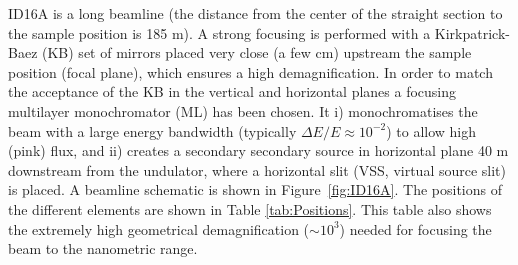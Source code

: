 \documentclass{iucr}              %
\begin{document}
\begin{table}\label{tab:Undulators}
\centering
\caption{Parameters of the undulators available at the ID16A beamline: period ($\lambda_u$), length ($L$), number of identical undulators ($N$) and deflection parameter ($K$) values for the three main photon energies in use. The valuse are shown for the two ESRF magnetic lattices: the old one (labelled ESRF, with $E_e = 6.04$ GeV) and the new one (EBS, with $E_e = 6.00$ GeV). $n$ is the emission harmonic in use for each particular photon energy.}

\end{table}

ID16A is a long beamline (the distance from the center of the straight section to the sample position is 185 m). A strong focusing is performed with a Kirkpatrick-Baez (KB) set of mirrors placed very close (a few cm) upstream the sample position (focal plane), which ensures a high demagnification. In order to match the acceptance of the KB in the vertical and horizontal planes a focusing multilayer monochromator (ML) has
been chosen. It i) monochromatises the beam with a large energy bandwidth (typically $\Delta E/E \approx 10^{-2}$) to allow high (pink) flux, 
and ii) creates a secondary secondary source in horizontal plane 40 m downstream from the undulator, where a horizontal slit (VSS, virtual source slit) is placed. A beamline schematic is shown in Figure~\ref{fig:ID16A}. The positions of the different elements are shown in Table \ref{tab:Positions}. This table also shows the extremely high geometrical demagnification ($\sim 10^3$) needed for focusing the beam to the nanometric range.  
\end{document}
